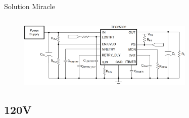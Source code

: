 \begin{frame}{Solution Miracle}
\begin{columns}
\begin{column}{0.66\textwidth}
        \end{column}
    \end{columns}
    \vfill
    \begin{figure}
        \centering
        \includegraphics[width=0.75\textwidth, height=0.4\textheight, keepaspectratio]{pictures/load-switch.png}
    \end{figure}
\end{frame}


\subsection{120V}

